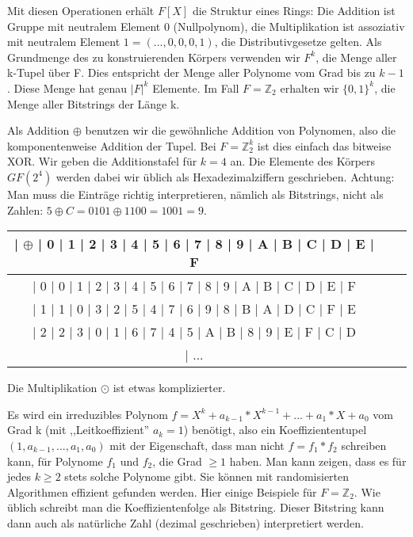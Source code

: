 \documentclass[a4paper]{article}
\begin{document}
\begin{multicols}{3}
    Mit diesen Operationen erhält $F[X]$ die Struktur eines Rings: Die Addition ist Gruppe mit neutralem Element 0 (Nullpolynom), die Multiplikation ist assoziativ mit neutralem Element $1=(...,0,0,0,1)$, die Distributivgesetze gelten.
    Als Grundmenge des zu konstruierenden Körpers verwenden wir $F^k$, die Menge aller k-Tupel über F. Dies entspricht der Menge aller Polynome vom Grad bis zu $k-1$. Diese Menge hat genau $|F|^k$ Elemente. Im Fall $F=\mathbb{Z}_2$ erhalten wir $\{0,1\}^k$, die Menge aller Bitstrings der Länge k.

    Als Addition $\oplus$ benutzen wir die gewöhnliche Addition von Polynomen, also die komponentenweise Addition der Tupel. Bei $F=\mathbb{Z}^k_2$ ist dies einfach das bitweise XOR. Wir geben die Additionstafel für $k=4$ an. Die Elemente des Körpers $GF(2^4)$ werden dabei wir üblich als Hexadezimalziffern geschrieben. Achtung: Man muss die Einträge richtig interpretieren, nämlich als Bitstrings, nicht als Zahlen: $5\oplus C=0101\oplus 1100=1001=9$.

    \begin{tabular}{c|c|c}
        | $\oplus$ | 0  | 1  | 2  | 3  | 4  | 5  | 6  | 7  | 8  | 9  | A  | B  | C  | D  | E  | F \\\hline
        | 0    | 0  | 1  | 2  | 3  | 4  | 5  | 6  | 7  | 8  | 9  | A  | B  | C  | D  | E  | F     \\
        | 1    | 1  | 0  | 3  | 2  | 5  | 4  | 7  | 6  | 9  | 8  | B  | A  | D  | C  | F  | E     \\
        | 2    | 2  | 3  | 0  | 1  | 6  | 7  | 4  | 5  | A  | B  | 8  | 9  | E  | F  | C  | D     \\
        | ...
    \end{tabular}

    Die Multiplikation $\odot$ ist etwas komplizierter.

    Es wird ein irreduzibles Polynom $f=X^k+a_{k-1}* X^{k-1}+...+a_1*X+a_0$ vom Grad k (mit ,,Leitkoeffizient'' $a_k=1$) benötigt, also ein Koeffiziententupel $(1,a_{k-1},...,a_1,a_0)$ mit der Eigenschaft, dass man nicht $f=f_1*f_2$ schreiben kann, für Polynome $f_1$ und $f_2$, die Grad $\geq 1$ haben. Man kann zeigen, dass es für jedes $k\geq 2$ stets solche Polynome gibt. Sie können mit randomisierten Algorithmen effizient gefunden werden. Hier einige Beispiele für $F=\mathbb{Z}_2$. Wie üblich schreibt man die Koeffizientenfolge als Bitstring. Dieser Bitstring kann dann auch als natürliche Zahl (dezimal geschrieben) interpretiert werden.


\end{multicols}
\end{document}
